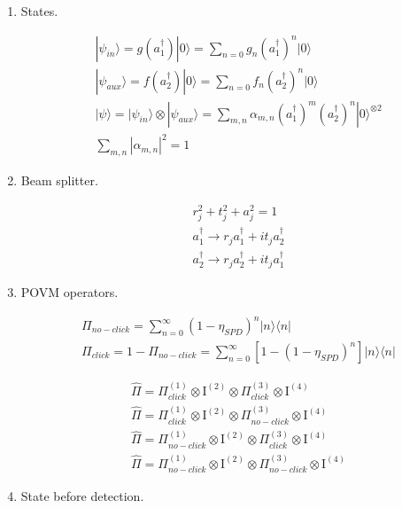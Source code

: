 \documentclass[12pt]{article}
\begin{document}
\begin{enumerate}
\item States.

\begin{align*}
& |\psi_{in}\rangle = g(a_{1}^{\dag})|0\rangle  = \sum_{n=0} g_{n} (a_{1}^{\dag})^{n} |0\rangle  \\ 
& |\psi_{aux}\rangle = f(a_{2}^{\dag})|0\rangle  = \sum_{n=0} f_{n} (a_{2}^{\dag})^{n} |0\rangle  \\
& |\psi\rangle = |\psi_{in}\rangle   \otimes   |\psi_{aux}\rangle = \sum_{m,n} \alpha_{m,n} (a_{1}^{\dag})^{m} (a_{2}^{\dag})^{n} |0\rangle^{\otimes 2} \\
& \sum_{m,n} |\alpha_{m,n}|^2 = 1 
\end{align*}

\item Beam splitter.

\begin{align*}
&  r_{j}^2 + t_{j}^2 + a_{j}^2 = 1 \\
&  a_{1}^{\dag} \rightarrow  r_{j}a_{1}^{\dag} + it_{j}a_{2}^{\dag} \\
&  a_{2}^{\dag} \rightarrow  r_{j}a_{2}^{\dag} + it_{j}a_{1}^{\dag} 
\end{align*}


\item POVM operators.

\begin{align*}
&  \Pi_{no-click} = \sum_{n=0}^{\infty} (1-\eta_{SPD})^n  |n\rangle  \langle n|   \\
&  \Pi_{click} = 1 - \Pi_{no-click} = \sum_{n=0}^{\infty}[1 - (1-\eta_{SPD})^n]  |n\rangle  \langle n|
\end{align*}



\begin{align*} 
&  \hat{\Pi} = \Pi_{click}^{(1)} \otimes  \textrm{I}^{(2)}  \otimes  \Pi_{click}^{(3)} \otimes  \textrm{I}^{(4)}   \\
&  \hat{\Pi} = \Pi_{click}^{(1)} \otimes  \textrm{I}^{(2)}  \otimes  \Pi_{no-click}^{(3)} \otimes  \textrm{I}^{(4)}  \\ 
&  \hat{\Pi} = \Pi_{no-click}^{(1)} \otimes  \textrm{I}^{(2)}  \otimes  \Pi_{click}^{(3)} \otimes  \textrm{I}^{(4)} \\
&    \hat{\Pi} = \Pi_{no-click}^{(1)} \otimes  \textrm{I}^{(2)}  \otimes  \Pi_{no-click}^{(3)} \otimes  \textrm{I}^{(4)}  
\end{align*}

\item State before detection.


\end{enumerate}
\end{document}
